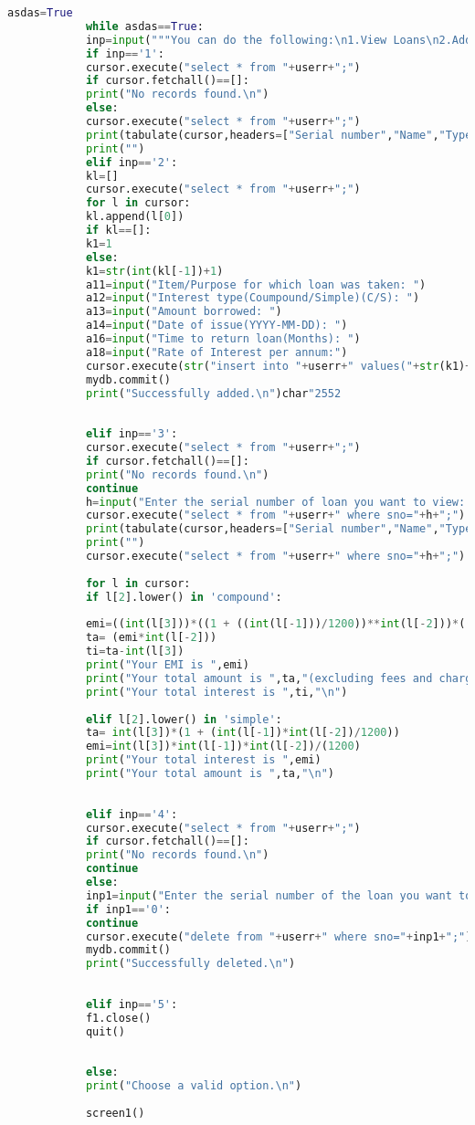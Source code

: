 \documentclass[12pt,a4paper]{article}
\begin{document}
\begin{normalsize}
\begin{lstlisting}[language=Python]
			asdas=True
			while asdas==True:
			inp=input("""You can do the following:\n1.View Loans\n2.Add Loans\n3.View Details of Loan\n4.Delete loans\n5.Exit\nWhat do you want to do?: """)
			if inp=='1':
			cursor.execute("select * from "+userr+";")
			if cursor.fetchall()==[]:
			print("No records found.\n")
			else:
			cursor.execute("select * from "+userr+";")
			print(tabulate(cursor,headers=["Serial number","Name","Type","Amount","Date of Issue","Months","Interest rate % p.a"],tablefmt='fancy_grid'))
			print("")
			elif inp=='2':
			kl=[]
			cursor.execute("select * from "+userr+";")
			for l in cursor:
			kl.append(l[0])
			if kl==[]:
			k1=1
			else:
			k1=str(int(kl[-1])+1)
			a11=input("Item/Purpose for which loan was taken: ")
			a12=input("Interest type(Coumpound/Simple)(C/S): ")
			a13=input("Amount borrowed: ")
			a14=input("Date of issue(YYYY-MM-DD): ")
			a16=input("Time to return loan(Months): ")
			a18=input("Rate of Interest per annum:")
			cursor.execute(str("insert into "+userr+" values("+str(k1)+",'"+str(a11)+"'"+",'"+str(a12)+"',"+str(a13)+",'"+str(a14)+"',"+str(a16)+","+str(a18)+");"))
			mydb.commit()
			print("Successfully added.\n")char"2552
			
			
			elif inp=='3':
			cursor.execute("select * from "+userr+";")
			if cursor.fetchall()==[]:
			print("No records found.\n")
			continue
			h=input("Enter the serial number of loan you want to view: ")
			cursor.execute("select * from "+userr+" where sno="+h+";")
			print(tabulate(cursor,headers=["Serial number","Name","Type","Amount","Date of Issue","Months","Interest rate % p.a"],tablefmt='fancy_grid'))
			print("")
			cursor.execute("select * from "+userr+" where sno="+h+";")
			
			for l in cursor:
			if l[2].lower() in 'compound':
			
			emi=((int(l[3]))*((1 + ((int(l[-1]))/1200))**int(l[-2]))*((int(l[-1]))/1200))/(((1+(int(l[-1])/1200))**int(l[-2]))-1)
			ta= (emi*int(l[-2]))
			ti=ta-int(l[3])
			print("Your EMI is ",emi)
			print("Your total amount is ",ta,"(excluding fees and charges from lender)")
			print("Your total interest is ",ti,"\n")
			
			elif l[2].lower() in 'simple':
			ta= int(l[3])*(1 + (int(l[-1])*int(l[-2])/1200))
			emi=int(l[3])*int(l[-1])*int(l[-2])/(1200)
			print("Your total interest is ",emi)
			print("Your total amount is ",ta,"\n")
			
			
			elif inp=='4':
			cursor.execute("select * from "+userr+";")
			if cursor.fetchall()==[]:
			print("No records found.\n")
			continue
			else:
			inp1=input("Enter the serial number of the loan you want to delete:(enter 0 if not sure) ")
			if inp1=='0':
			continue
			cursor.execute("delete from "+userr+" where sno="+inp1+";")
			mydb.commit()
			print("Successfully deleted.\n")
			
			
			elif inp=='5':
			f1.close()
			quit()
			
			
			else:
			print("Choose a valid option.\n")
			
			screen1()
		\end{lstlisting}
	\end{normalsize}
\end{document}

